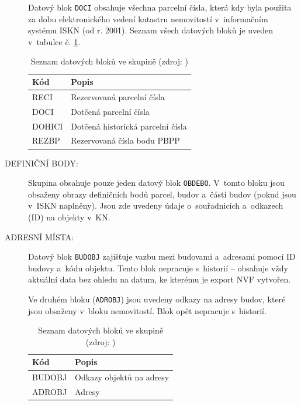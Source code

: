 \documentclass[a4paper,12pt,oneside]{book}
\begin{document}
\begin{description}
  Datový blok \texttt{DOCI} obsahuje všechna parcelní čísla, která kdy
  byla použita za dobu elektronického vedení katastru nemovitostí
  v~informačním systému ISKN (od r. 2001). Seznam všech datových bloků
  je uveden v~tabulce č. \ref{t_skupina_rezCisla}. \cite{dp_landa}
  \cite{vfk_struktura}

\begin{table}[htbp]
\centering
\caption[Seznam datových bloků ve skupině ]{Seznam datových bloků ve skupině  (zdroj: \cite{vfk_struktura})}
\begin{tabular}{ll}
\toprule
\textbf{Kód} & \textbf{Popis} \\ 
\midrule
RECI & Rezervovaná parcelní čísla \\
DOCI & Dotčená parcelní čísla \\
DOHICI & Dotčená historická parcelní čísla \\
REZBP & Rezervovaná čísla bodu PBPP \\
\bottomrule
\end{tabular}
\label{t_skupina_rezCisla}
\end{table}

\item[DEFINIČNÍ BODY:] Skupina obsahuje pouze jeden datový blok
  \texttt{OBDEBO}. V~tomto bloku jsou obsaženy obrazy definičních bodů
  parcel, budov a~částí budov (pokud jsou v~ISKN naplněny). Jsou zde
  uvedeny údaje o~souřadnicích a~odkazech (ID) na objekty
  v~KN. \cite{vfk_struktura}
 
\item[ADRESNÍ MÍSTA:] Datový blok \texttt{BUDOBJ} zajišťuje vazbu mezi
  budovami a~adresami pomocí ID budovy a~kódu objektu. Tento blok
  nepracuje s~historií -- obsahuje vždy aktuální data bez ohledu na
  datum, ke kterému je export NVF vytvořen.
 
  Ve druhém bloku (\texttt{ADROBJ}) jsou uvedeny odkazy na adresy
  budov, které jsou obsaženy v~bloku nemovitostí. Blok opět nepracuje
  s~historií. \cite{vfk_struktura}

\begin{table}[htbp]
\centering
\caption[Seznam datových bloků ve skupině ]{Seznam datových bloků ve skupině  (zdroj: \cite{vfk_struktura})}
\begin{tabular}{ll}
\toprule
\textbf{Kód} & \textbf{Popis} \\ 
\midrule
BUDOBJ & Odkazy objektů na adresy \\
ADROBJ & Adresy \\
\bottomrule
\end{tabular}
\label{t_skupina_adrMista}
\end{table}
 
\end{description}
\end{document}
